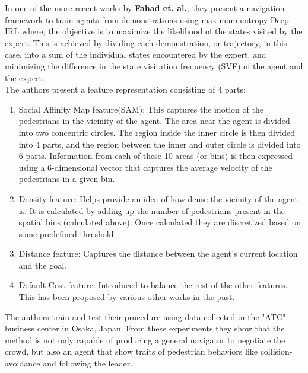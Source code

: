 In one of the more recent works by \textbf{Fahad et. al.}, they present a navigation framework to train agents from demonstrations using maximum entropy Deep IRL where, the objective is to maximize the likelihood of the states visited by the expert.
This is achieved by dividing each demonstration, or trajectory, in this case, into a sum of the individual states encountered by the expert. and minimizing the difference in the state visitation frequency (SVF) of the agent and the expert.\\
The authors present a feature representation consisting of 4 parts:
\begin{enumerate}
	\item Social Affinity Map feature(SAM): This captures the motion of the pedestrians in the vicinity of the agent. The area near the agent is divided into two concentric circles. The region inside the inner circle is then divided into 4 parts, and the region between the inner and outer circle is divided into 6 parts.
	Information from each of these 10 areas (or bins) is then expressed using a 6-dimensional vector that captures the average velocity of the pedestrians in a given bin. 
	\item Density feature: Helps provide an idea of how dense the vicinity of the agent is. It is calculated by adding up the number of pedestrians present in the spatial bins (calculated above). Once calculated they are discretized based on some predefined threshold.
	\item Distance feature: Captures the distance between the agent's current location and the goal.
	\item Default Cost feature: Introduced to balance the rest of the other features. This has been proposed by various other works in the past.
	
\end{enumerate}
The authors train and test their procedure using data collected in the "ATC" business center in Osaka, Japan.
From these experiments they show that the method is not only capable of producing a general navigator to negotiate the crowd, but also an agent that show traits of pedestrian behaviors like collision-avoidance and following the leader.


